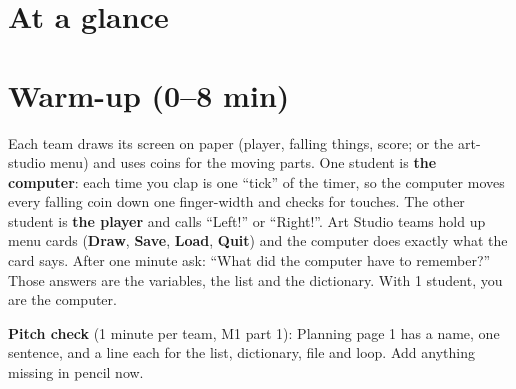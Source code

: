 \section{At a glance}
\begin{timeplan}
\end{timeplan}


\section{Warm-up (0--8 min)}
\begin{unplugged}
Each team draws its screen on paper (player, falling things, score; or the art-studio menu) and
uses coins for the moving parts. One student is \textbf{the computer}: each time you clap is one
\enquote{tick} of the timer, so the computer moves every falling coin down one finger-width and
checks for touches. The other student is \textbf{the player} and calls \enquote{Left!} or
\enquote{Right!}. Art Studio teams hold up menu cards (\textbf{Draw}, \textbf{Save}, \textbf{Load},
\textbf{Quit}) and the computer does exactly what the card says.
After one minute ask: \enquote{What did the computer have to remember?} Those answers are the
variables, the list and the dictionary. With 1 student, you are the computer.

\textbf{Pitch check} (1 minute per team, M1 part 1): Planning page 1 has a name, one sentence, and a
line each for the list, dictionary, file and loop. Add anything missing in pencil now.
\end{unplugged}

